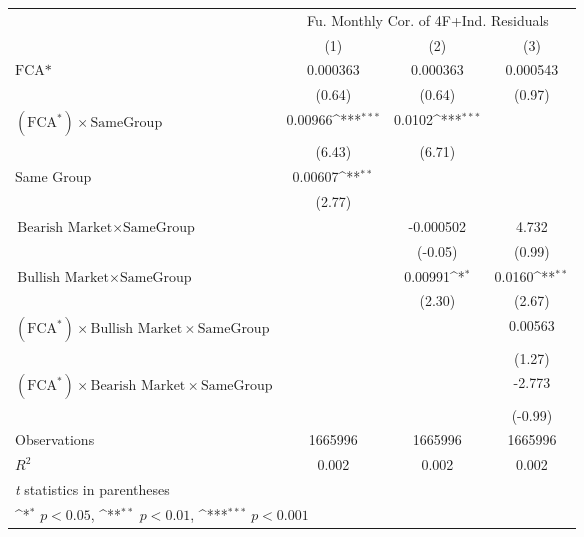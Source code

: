 {
\def\sym#1{\ifmmode^{#1}\else\(^{#1}\)\fi}
\begin{tabular}{l*{3}{c}}
\hline\hline
                &\multicolumn{3}{c}{Fu. Monthly Cor. of 4F+Ind. Residuals}\\\cmidrule(lr){2-4}
                &\multicolumn{1}{c}{(1)}         &\multicolumn{1}{c}{(2)}         &\multicolumn{1}{c}{(3)}         \\
\hline
$ \text{FCA*} $ & 0.000363         & 0.000363         & 0.000543         \\
                &   (0.64)         &   (0.64)         &   (0.97)         \\
[1em]
 $ (\text{FCA}^*) \times {\text{SameGroup} }  $ &  0.00966\sym{***}&   0.0102\sym{***}&                  \\
                &   (6.43)         &   (6.71)         &                  \\
[1em]
Same Group      &  0.00607\sym{**} &                  &                  \\
                &   (2.77)         &                  &                  \\
[1em]
$ {\text{Bearish Market} } \times {\text{SameGroup} }  $ &                  &-0.000502         &    4.732         \\
                &                  &  (-0.05)         &   (0.99)         \\
[1em]
$ {\text{Bullish Market} } \times {\text{SameGroup} }  $ &                  &  0.00991\sym{*}  &   0.0160\sym{**} \\
                &                  &   (2.30)         &   (2.67)         \\
[1em]
$ (\text{FCA}^*) \times {\text{Bullish Market}} \times {\text{SameGroup} }  $ &                  &                  &  0.00563         \\
                &                  &                  &   (1.27)         \\
[1em]
$ (\text{FCA}^*) \times {\text{Bearish Market}} \times {\text{SameGroup} }  $ &                  &                  &   -2.773         \\
                &                  &                  &  (-0.99)         \\
\hline
Observations    &  1665996         &  1665996         &  1665996         \\
\(R^{2}\)       &    0.002         &    0.002         &    0.002         \\
\hline\hline
\multicolumn{4}{l}{\footnotesize \textit{t} statistics in parentheses}\\
\multicolumn{4}{l}{\footnotesize \sym{*} \(p<0.05\), \sym{**} \(p<0.01\), \sym{***} \(p<0.001\)}\\
\end{tabular}
}
